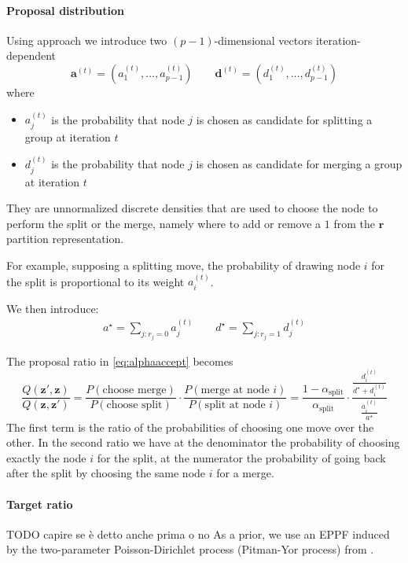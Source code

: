\paragraph{Proposal distribution}\label{par:proposalratio}

Using \textcite{bensonAdaptiveMCMCMultiple2018} approach we introduce two $( p-1)$-dimensional vectors iteration-dependent
\begin{equation*}
\mathbf{a}^{( t)} =( a_{1}^{( t)} ,\dotsc ,a_{p-1}^{( t)}) \qquad \mathbf{d}^{( t)} =( d_{1}^{( t)} ,\dotsc ,d_{p-1}^{( t)})
\end{equation*}
where
\begin{itemize}
\item $a_{j}^{( t)}$ is the probability that node $j$ is chosen as candidate for splitting a group at iteration $t$
\item $d_{j}^{( t)}$ is the probability that node $j$ is chosen as candidate for merging a group at iteration $t$
\end{itemize}
They are unnormalized discrete densities that are used to choose the node to perform the split or the merge, namely where to add or remove a $1$ from the $\bm{r}$ partition representation.

For example, supposing a splitting move, the probability of drawing node $i$ for the split is proportional to its weight $a_{i}^{(t)}$.

We then introduce:
\begin{align*}
    a^{\star} = \sum\nolimits_{j:r_j=0}{a_{j}^{(t)}} \qquad d^{\star} = \sum\nolimits_{j:r_j=1}{d_{j}^{(t)}}
\end{align*}

The proposal ratio in \eqref{eq:alphaaccept} becomes
\[
    \frac{Q(\bm{z}',\bm{z})}{Q(\bm{z},\bm{z}')}
    =
    \frac{P(\text{choose merge})}{P(\text{choose split})}
    \cdot 
    \frac{P(\text{merge at node $i$})}{P(\text{split at node $i$})}
    =
    \frac{1-\alpha_{\text{split}}}{\alpha_{\text{split}}}
    \cdot
    \frac{\frac{d_{i}^{(t)}}{d^{\star}+d_{i}^{(t)}}}{\frac{a_{i}^{(t)}}{a^{\star}}}
\]
The first term is the ratio of the probabilities of choosing one move over the other. In the second ratio we have at the denominator the probability of choosing exactly the node $i$ for the split, at the numerator the probability of going back after the split  by choosing the same node $i$ for a merge.
\paragraph{Target ratio}
TODO capire se è detto anche prima o no
As a prior, we use an EPPF induced by the two-parameter Poisson-Dirichlet process (Pitman-Yor process) from \textcite[830]{martinezNonparametricChangePoint2014}.

